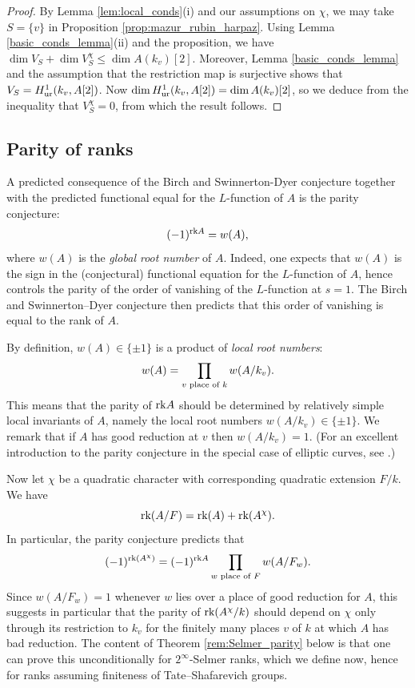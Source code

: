 \documentclass[10pt]{amsart}
\numberwithin{equation}{section}
\theoremstyle{remark}
\theoremstyle{definition}
\theoremstyle{definition}
\theoremstyle{definition}
\theoremstyle{definition}
\theoremstyle{definition}
\theoremstyle{definition}
\theoremstyle{definition}
\theoremstyle{definition}
\begin{document}
\begin{proof}
 By  Lemma \ref{lem:local_conds}(i) and our assumptions on $\chi$, we may take $S=\{v\}$ in  Proposition \ref{prop:mazur_rubin_harpaz}. Using  Lemma \ref{basic_conds_lemma}(ii) and the proposition, we have $\dim V_S+\dim V_S^\chi\leq \dim A(k_v)[2].$ Moreover, Lemma \ref{basic_conds_lemma} and the assumption that the restriction map is surjective shows that $V_S=H^1_{\textup{ur}}(k_v,A[2])$. Now $\dim H^1_{\textup{ur}}(k_v,A[2])=\dim A(k_v)[2]$, so we deduce from the inequality that $V_S^\chi=0$, from which the result follows.
\end{proof}

\subsection{Parity of ranks}

A predicted consequence of the Birch and Swinnerton-Dyer conjecture together with the predicted functional equal for the $L$-function of $A$ is the parity conjecture: 
\[(-1)^{\textup{rk}A}=w(A),\]
where $w(A)$ is the \textit{global root number} of $A$. Indeed, one expects that $w(A)$ is the sign in the (conjectural) functional equation for the $L$-function of $A$, hence controls the parity of the order of vanishing of the $L$-function at $s=1$. The Birch and Swinnerton--Dyer conjecture then predicts that this order of vanishing is equal to the rank of $A$.

 By definition, $w(A)\in \{\pm 1\}$ is a product of \textit{local root numbers}:
\[w(A)=\prod_{v\textup{ place of }k}w(A/k_v).\]
This means that the parity of $\textup{rk}A$ should be determined by relatively simple local invariants of $A$, namely the local root numbers $w(A/k_v)\in \{\pm 1\}$. We remark that if $A$ has good reduction at $v$ then $w(A/k_v)=1$. (For an excellent introduction to the parity conjecture in the special case of elliptic curves, see \cite{Dok13}.)

Now let $\chi$ be a quadratic character with corresponding quadratic extension $F/k$. We have 
\[\textup{rk}(A/F)=\textup{rk}(A)+\textup{rk}(A^\chi).\]
In particular, the parity conjecture predicts that 
\begin{equation} \label{eq:rank_decomp}
(-1)^{\textup{rk}(A^\chi)}=(-1)^{\textup{rk}A}\prod_{w\textup{ place of }F}w(A/F_w).
\end{equation}
Since $w(A/F_w)=1$ whenever $w$ lies over a place of good reduction for $A$, this suggests in particular that the parity of $\textup{rk}(A^\chi/k)$ should depend on $\chi$ only through its restriction to $k_v$ for the finitely many places $v$ of $k$ at which $A$ has bad reduction. The content of Theorem \ref{rem:Selmer_parity} below is that one can prove this unconditionally for $2^\infty$-Selmer ranks, which we define now, hence for ranks assuming finiteness of Tate--Shafarevich groups.  
\end{document}
